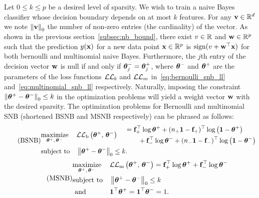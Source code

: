 Let $0 \leq k \leq p$ be a desired level of sparsity.
We wish to train a naive Bayes classifier whose decision boundary depends on at most $k$ features.
For any $\mathbf{v} \in \mathbb{R}^d$ we note $\left\lVert\mathbf{v}\right\rVert_0$ the number of non-zero entries
(the cardinality) of the vector.
As shown in the previous section~\ref{subsec:nb_bound},
there exist $v \in \mathbb{R}$ and $\mathbf{w} \in \mathbb{R}^p$ such that the prediction $y(\mathbf{x})$ for a new data point $\mathbf{x}\in\mathbb{R}^p$ is
$\operatorname*{sign}(v + \mathbf{w}^\top\mathbf{x})$ for both bernoulli and multinomial naive Bayes.
Furthermore, the $j$th entry of the decision vector $\mathbf{w}$ is null if and only if $\bm{\theta}^-_j = \bm{\theta}^+_j$,
where $\bm{\theta}^-$ and $\bm{\theta}^+$ are the parameters of the loss functions $\mathcal{L}\mathcal{L}_b$ and $\mathcal{L}\mathcal{L}_m$
in~\ref{eq:bernoulli_snb_ll} and~\ref{eq:multinomial_snb_ll} respectively.
Naturally, imposing the constraint $\left\lVert\bm{\theta}^+ - \bm{\theta}^-\right\rVert_0 \leq k$ in the optimization problems
will yield a weight vector $\mathbf{w}$ with the desired sparsity.
The optimization problems for Bernoulli and multinomial SNB
(shortened BSNB and MSNB respectively) can be phrased as follows:
\begin{equation}\label{eq:bsnb}\tag{BSNB}
    \begin{aligned}
        & \underset{\bm{\theta}^+,\, \bm{\theta}^-}{\text{maximize}}
        & & \mathcal{L}\mathcal{L}_\text{b}\left( \bm{\theta}^+,\, \bm{\theta}^- \right)
            \begin{split}
                &&&= \mathbf{f}_+^\top\log\bm{\theta}^+ + (n_+\mathbf{1} - \mathbf{f}_+)^\top\log\left( \mathbf{1} - \bm{\theta}^+ \right)\\
                &&&\qquad+ \mathbf{f}_-^\top\log\bm{\theta}^- + (n_-\mathbf{1} - \mathbf{f}_-)^\top\log\left( \mathbf{1} - \bm{\theta}^- \right)
            \end{split}\\
        & \text{subject to}
        & & \left\lVert\bm{\theta}^+ - \bm{\theta}^-\right\rVert_0 \leq k.
    \end{aligned}
\end{equation}
\begin{equation}\label{eq:msnb}\tag{MSNB}
    \begin{aligned}
        & \underset{\bm{\theta}^+,\, \bm{\theta}^-}{\text{maximize}}
        & & \mathcal{L}\mathcal{L}_\text{m}\left( \bm{\theta}^+,\, \bm{\theta}^- \right) = \mathbf{f}_+^\top\log\bm{\theta}^+ + \mathbf{f}_-^\top\log\bm{\theta}^-\\
        & \text{subject to}
        & & \left\lVert\bm{\theta}^+ - \bm{\theta}^-\right\rVert_0 \leq k\\
        & \text{ and }
        & & \mathbf{1}^\top\bm{\theta}^+ = \mathbf{1}^\top\bm{\theta}^- = 1.
    \end{aligned}
\end{equation}

